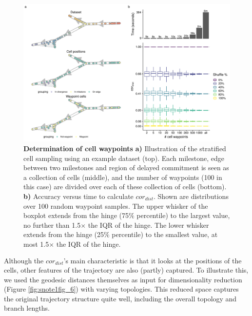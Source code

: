 \begin{figure}[tbh!]
	\centering\includegraphics[width=\linewidth]{fig/snote1fig_5.pdf}
	\caption{
		\textbf{Determination of cell waypoints} \textbf{a)} Illustration of the stratified cell sampling using an example dataset (top). Each milestone, edge between two milestones and region of delayed commitment is seen as a collection of cells (middle), and the number of waypoints (100 in this case) are divided over each of these collection of cells (bottom). \textbf{b)} Accuracy versus time to calculate $\textit{cor}_{\textit{dist}}$. Shown are distributions over 100 random waypoint samples. The upper whisker of the boxplot extends from the hinge (75$\%$ percentile) to the largest value, no further than 1.5$\times$ the IQR of the hinge. The lower whisker extends from the hinge (25$\%$ percentile) to the smallest value, at most 1.5$\times$ the IQR of the hinge.
	}
	\label{fig:snote1fig_5}
\end{figure}

Although the $\textit{cor}_{\textit{dist}}$'s main characteristic is that it looks at the positions of the cells, other features of the trajectory are also (partly) captured. To illustrate this, we used the geodesic distances themselves as input for dimensionality reduction (Figure \ref{fig:snote1fig_6}) with varying topologies. This reduced space captures the original trajectory structure quite well, including the overall topology and branch lengths.

